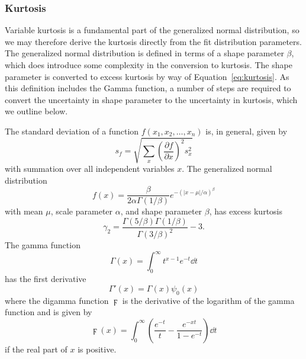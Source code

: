 \subsubsection{Kurtosis}
\label{subsubsec:analysis--redshift_trends--kurtosis}


Variable kurtosis is a fundamental part of the generalized normal distribution, so we may therefore derive the kurtosis directly from the fit distribution parameters.  The generalized normal distribution is defined in terms of a shape parameter $\beta$, which does introduce some complexity in the conversion to kurtosis.  The shape parameter is converted to excess kurtosis by way of Equation~\ref{eq:kurtosis}.  As this definition includes the Gamma function, a number of steps are required to convert the uncertainty in shape parameter to the uncertainty in kurtosis, which we outline below.

The standard deviation of a function $f(x_{1},x_{2},\dots,x_{n})$ is, in general, given by
\begin{equation} \label{eq:general_stdev}
	s_{f} = \sqrt{\sum_{x} \left( \frac{\partial f}{\partial x} \right)^{2} s_{x}^{2}}
\end{equation}
with summation over all independent variables $x$.  The generalized normal distribution
\begin{equation} \label{eq:generalized_normal}
	f(x) = \frac{\beta}{2 \alpha \Gamma(1/\beta)} e^{-(|x - \mu| / \alpha)^{\beta}}
\end{equation}
with mean $\mu$, scale parameter $\alpha$, and shape parameter $\beta$, has excess kurtosis
\begin{equation} \label{eq:kurtosis}
	\gamma_{2} = \frac{\Gamma(5/\beta) \Gamma(1/\beta)}{\Gamma(3/\beta)^{2}} - 3.
\end{equation}
The gamma function
\begin{equation} \label{eq:gamma_function}
	\Gamma(x) = \int_{0}^{\infty} t^{x-1} e^{-t} \dd t
\end{equation}
has the first derivative
\begin{equation} \label{eq:gamma_prime}
	\Gamma'(x) = \Gamma(x) \psi_{0}(x)
\end{equation}
where the digamma function $\digamma$ is the derivative of the logarithm of the gamma function and is given by
\begin{equation} \label{eq:digamma}
	\digamma(x) = \int_{0}^{\infty} \left( \frac{e^{-t}}{t} - \frac{e^{-xt}}{1 - e^{-t}} \right) \dd t
\end{equation}
if the real part of $x$ is positive.

